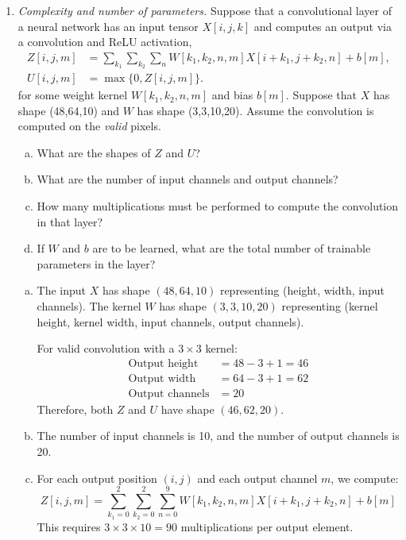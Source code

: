 \documentclass[11pt]{article}
\begin{document}
\begin{enumerate}
\item \emph{Complexity and number of parameters.}
Suppose that a convolutional layer of a neural network has an input tensor $X[i,j,k]$ and computes
an output via a convolution and ReLU activation,
\begin{align*}
    Z[i,j,m] &= \sum_{k_1} \sum_{k_2} \sum_n W[k_1,k_2,n,m]X[i+k_1,j+k_2,n] + b[m], \\
    U[i,j,m] &= \max\{0, Z[i,j,m] \}.
\end{align*}
for some weight kernel $W[k_1,k_2,n,m]$ and bias $b[m]$.  Suppose that $X$ has shape (48,64,10) and $W$ has shape (3,3,10,20).
Assume the convolution is computed on the \emph{valid} pixels.
\begin{enumerate}[(a)]
\item What are the shapes of $Z$ and $U$?
\item What are the number of input channels and output channels?
\item How many multiplications must be performed to compute the convolution in that layer?
\item If $W$ and $b$ are to be learned, what are the total number of trainable parameters in the layer?
\end{enumerate}

\begin{solution}
\begin{enumerate}[(a)]
\item The input $X$ has shape $(48, 64, 10)$ representing (height, width, input channels).
The kernel $W$ has shape $(3, 3, 10, 20)$ representing (kernel height, kernel width, input channels, output channels).

For valid convolution with a $3 \times 3$ kernel:
\begin{align*}
\text{Output height} &= 48 - 3 + 1 = 46 \\
\text{Output width} &= 64 - 3 + 1 = 62 \\
\text{Output channels} &= 20
\end{align*}
Therefore, both $Z$ and $U$ have shape $(46, 62, 20)$.

\item The number of input channels is 10, and the number of output channels is 20.

\item For each output position $(i,j)$ and each output channel $m$, we compute:
\[
Z[i,j,m] = \sum_{k_1=0}^{2} \sum_{k_2=0}^{2} \sum_{n=0}^{9} W[k_1,k_2,n,m] X[i+k_1,j+k_2,n] + b[m]
\]
This requires $3 \times 3 \times 10 = 90$ multiplications per output element.


\end{enumerate}
\end{solution}
\end{enumerate}
\end{document}
